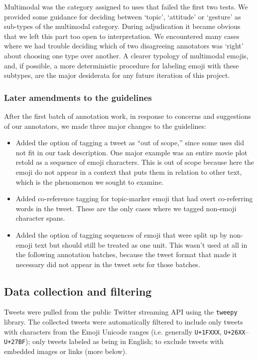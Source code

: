 \documentclass[11pt]{article}
\begin{document}
Multimodal was the category assigned to uses that failed the first two tests. We provided
some guidance for deciding between `topic', `attitude' or `gesture' as sub-types of the multimodal category.
During adjudication it became obvious that we left this part too open to interpretation. We encountered many
cases where we had trouble deciding which of two disagreeing annotators was `right' about choosing one type
over another. A clearer typology of multimodal emojis, and, if possible, a more deterministic procedure for
labeling emoji with these subtypes, are the major desiderata for any future iteration of this project.

\subsubsection{Later amendments to the guidelines}

After the first batch of annotation work, in response to concerns and suggestions of our annotators, we made
three major changes to the guidelines:
\begin{itemize}
  \item Added the option of tagging a tweet as ``out of scope,'' since some uses did not fit in our task description. One
major example was an entire movie plot retold as a sequence of emoji characters. This is out of scope because
here the emoji do not appear in a context that puts them in relation to other text, which is the phenomenon
we sought to examine.

\item Added co-reference tagging for topic-marker emoji that had overt co-referring words in the tweet. These are
the only cases where we tagged non-emoji character spans.

\item Added the option of tagging sequences of emoji that were split up by non-emoji text but should still be
treated as one unit. This wasn't used at all in the following annotation batches, because the tweet format that
made it necessary did not appear in the tweet sets for those batches.
\end{itemize}

\subsection{Data collection and filtering}
Tweets were pulled from the public Twitter streaming API using the \texttt{tweepy} library. The collected tweets were automatically filtered to include only tweets with characters from the Emoji Unicode ranges (i.e. generally \texttt{U+1FXXX}, \texttt{U+26XX}--\texttt{U+27BF}); only tweets labeled as being in English; to exclude tweets with embedded images or links (more below).
\end{document}
